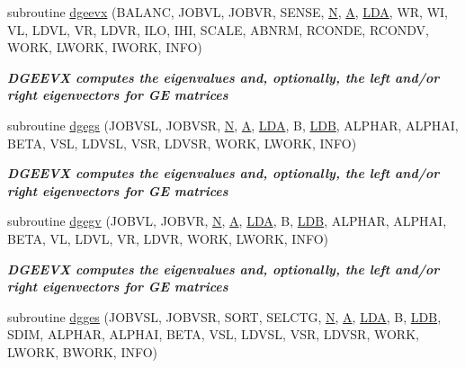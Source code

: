 \begin{DoxyCompactItemize}
subroutine \hyperlink{group__doubleGEeigen_ga4e35e1d4e9b63ba9eef4ba8aff3debae}{dgeevx} (B\+A\+L\+A\+N\+C, J\+O\+B\+V\+L, J\+O\+B\+V\+R, S\+E\+N\+S\+E, \hyperlink{polmisc_8c_a0240ac851181b84ac374872dc5434ee4}{N}, \hyperlink{classA}{A}, \hyperlink{example__user_8c_ae946da542ce0db94dced19b2ecefd1aa}{L\+D\+A}, W\+R, W\+I, V\+L, L\+D\+V\+L, V\+R, L\+D\+V\+R, I\+L\+O, I\+H\+I, S\+C\+A\+L\+E, A\+B\+N\+R\+M, R\+C\+O\+N\+D\+E, R\+C\+O\+N\+D\+V, W\+O\+R\+K, L\+W\+O\+R\+K, I\+W\+O\+R\+K, I\+N\+F\+O)
\begin{DoxyCompactList}\small\item\em {\bfseries  D\+G\+E\+E\+V\+X computes the eigenvalues and, optionally, the left and/or right eigenvectors for G\+E matrices} \end{DoxyCompactList}\item 
subroutine \hyperlink{group__doubleGEeigen_gaf64f56e7012093f95cd35f59271b85bf}{dgegs} (J\+O\+B\+V\+S\+L, J\+O\+B\+V\+S\+R, \hyperlink{polmisc_8c_a0240ac851181b84ac374872dc5434ee4}{N}, \hyperlink{classA}{A}, \hyperlink{example__user_8c_ae946da542ce0db94dced19b2ecefd1aa}{L\+D\+A}, B, \hyperlink{example__user_8c_a50e90a7104df172b5a89a06c47fcca04}{L\+D\+B}, A\+L\+P\+H\+A\+R, A\+L\+P\+H\+A\+I, B\+E\+T\+A, V\+S\+L, L\+D\+V\+S\+L, V\+S\+R, L\+D\+V\+S\+R, W\+O\+R\+K, L\+W\+O\+R\+K, I\+N\+F\+O)
\begin{DoxyCompactList}\small\item\em {\bfseries  D\+G\+E\+E\+V\+X computes the eigenvalues and, optionally, the left and/or right eigenvectors for G\+E matrices} \end{DoxyCompactList}\item 
subroutine \hyperlink{group__doubleGEeigen_ga4a909655349307569c2a11e703a7ac08}{dgegv} (J\+O\+B\+V\+L, J\+O\+B\+V\+R, \hyperlink{polmisc_8c_a0240ac851181b84ac374872dc5434ee4}{N}, \hyperlink{classA}{A}, \hyperlink{example__user_8c_ae946da542ce0db94dced19b2ecefd1aa}{L\+D\+A}, B, \hyperlink{example__user_8c_a50e90a7104df172b5a89a06c47fcca04}{L\+D\+B}, A\+L\+P\+H\+A\+R, A\+L\+P\+H\+A\+I, B\+E\+T\+A, V\+L, L\+D\+V\+L, V\+R, L\+D\+V\+R, W\+O\+R\+K, L\+W\+O\+R\+K, I\+N\+F\+O)
\begin{DoxyCompactList}\small\item\em {\bfseries  D\+G\+E\+E\+V\+X computes the eigenvalues and, optionally, the left and/or right eigenvectors for G\+E matrices} \end{DoxyCompactList}\item 
subroutine \hyperlink{group__doubleGEeigen_ga8637d4b822e19d10327ddcb4235dc08e}{dgges} (J\+O\+B\+V\+S\+L, J\+O\+B\+V\+S\+R, S\+O\+R\+T, S\+E\+L\+C\+T\+G, \hyperlink{polmisc_8c_a0240ac851181b84ac374872dc5434ee4}{N}, \hyperlink{classA}{A}, \hyperlink{example__user_8c_ae946da542ce0db94dced19b2ecefd1aa}{L\+D\+A}, B, \hyperlink{example__user_8c_a50e90a7104df172b5a89a06c47fcca04}{L\+D\+B}, S\+D\+I\+M, A\+L\+P\+H\+A\+R, A\+L\+P\+H\+A\+I, B\+E\+T\+A, V\+S\+L, L\+D\+V\+S\+L, V\+S\+R, L\+D\+V\+S\+R, W\+O\+R\+K, L\+W\+O\+R\+K, B\+W\+O\+R\+K, I\+N\+F\+O)

\end{DoxyCompactItemize}
